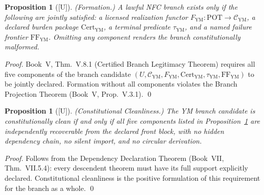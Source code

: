 \documentclass[12pt,oneside]{amsbook}
\theoremstyle{plain}
\newtheorem{proposition}[theorem]{Proposition}
\theoremstyle{definition}
\theoremstyle{remark}
\newcommand{\status}[1]{\textup{[#1]}}
\begin{document}
\begin{proposition}[\status{U}]\label{prop:formation}
\textup{(Formation.)} A lawful NFC branch exists only if the
following are jointly satisfied: a licensed realization functor
$F_{\mathrm{YM}} : \mathrm{POT} \to \mathcal{C}_{\mathrm{YM}}$,
a declared burden package $\mathrm{Cert}_{\mathrm{YM}}$, a
terminal predicate $\tau_{\mathrm{YM}}$, and a named failure
frontier $\mathrm{FF}_{\mathrm{YM}}$. Omitting any component
renders the branch constitutionally malformed.
\end{proposition}

\begin{proof}
Book~V, Thm.~V.8.1 (Certified Branch Legitimacy Theorem) requires
all five components of the branch candidate
$(U, \mathcal{C}_{\mathrm{YM}}, F_{\mathrm{YM}},
\mathrm{Cert}_{\mathrm{YM}}, \tau_{\mathrm{YM}},
\mathrm{FF}_{\mathrm{YM}})$ to be jointly declared. Formation
without all components violates the Branch Projection Theorem
(Book~V, Prop.~V.3.1).
\qed
\end{proof}

\begin{proposition}[\status{U}]\label{prop:cleanliness}
\textup{(Constitutional Cleanliness.)} The YM branch candidate
is constitutionally clean if and only if all five components
listed in Proposition~\ref{prop:formation} are independently
recoverable from the declared front block, with no hidden
dependency chain, no silent import, and no circular derivation.
\end{proposition}

\begin{proof}
Follows from the Dependency Declaration Theorem (Book~VII,
Thm.~VII.5.4): every descendent theorem must have its full support
explicitly declared. Constitutional cleanliness is the positive
formulation of this requirement for the branch as a whole.
\qed
\end{proof}
\end{document}
